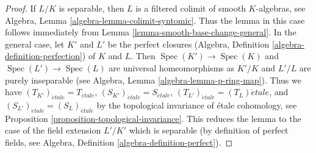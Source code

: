 \documentclass[10pt,a4paper]{amsart}
\theoremstyle{plain}
\theoremstyle{definition}
\theoremstyle{remark}
\numberwithin{equation}{subsection}
\def\Spec{\mathop{\mathrm{Spec}}}
\def\etale{{\acute{e}tale}}
\begin{document}
\begin{proof}
If $L/K$ is separable, then $L$ is a filtered colimit of smooth
$K$-algebras, see
Algebra, Lemma \ref{algebra-lemma-colimit-syntomic}.
Thus the lemma in this case follows immediately from
Lemma \ref{lemma-smooth-base-change-general}.
In the general case, let $K'$ and $L'$ be the perfect closures
(Algebra, Definition \ref{algebra-definition-perfection})
of $K$ and $L$. Then $\Spec(K') \to \Spec(K)$ and
$\Spec(L') \to \Spec(L)$ are universal homeomorphisms
as $K'/K$ and $L'/L$ are purely inseparable
(see Algebra, Lemma \ref{algebra-lemma-p-ring-map}).
Thus we have $(T_{K'})_\etale = T_\etale$,
$(S_{K'})_\etale = S_\etale$,
$(T_{L'})_\etale = (T_L)\etale$, and
$(S_{L'})_\etale = (S_L)_\etale$ by
the topological invariance of \'etale cohomology, see
Proposition \ref{proposition-topological-invariance}.
This reduces the lemma to the case of the field
extension $L'/K'$ which is separable (by definition of
perfect fields, see Algebra, Definition \ref{algebra-definition-perfect}).
\end{proof}
\end{document}
